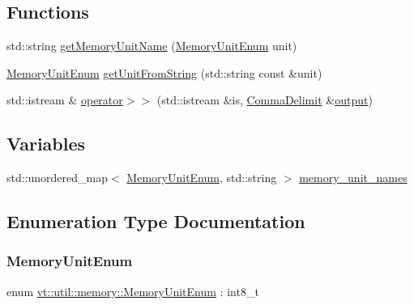 \subsection*{Functions}
\begin{DoxyCompactItemize}
\item 
std\+::string \hyperlink{namespacevt_1_1util_1_1memory_a6a1de4e8806e74e6e0ef92e4262b654b}{get\+Memory\+Unit\+Name} (\hyperlink{namespacevt_1_1util_1_1memory_a64df3d84293b34009f78e2a1db2f9bb6}{Memory\+Unit\+Enum} unit)
\item 
\hyperlink{namespacevt_1_1util_1_1memory_a64df3d84293b34009f78e2a1db2f9bb6}{Memory\+Unit\+Enum} \hyperlink{namespacevt_1_1util_1_1memory_aeceb7d7ac924dd3d88a58eab5ebf64f7}{get\+Unit\+From\+String} (std\+::string const \&unit)
\item 
std\+::istream \& \hyperlink{namespacevt_1_1util_1_1memory_afe1acbbca9aa1bd7310548cefd40045c}{operator$>$$>$} (std\+::istream \&is, \hyperlink{structvt_1_1util_1_1memory_1_1_comma_delimit}{Comma\+Delimit} \&\hyperlink{namespacevt_ad3ca3e8710dd3c8badff897f8de3c858}{output})
\end{DoxyCompactItemize}
\subsection*{Variables}
\begin{DoxyCompactItemize}
\item 
std\+::unordered\+\_\+map$<$ \hyperlink{namespacevt_1_1util_1_1memory_a64df3d84293b34009f78e2a1db2f9bb6}{Memory\+Unit\+Enum}, std\+::string $>$ \hyperlink{namespacevt_1_1util_1_1memory_aa772e07fd4860ed4086654c53eed51c2}{memory\+\_\+unit\+\_\+names}
\end{DoxyCompactItemize}


\subsection{Enumeration Type Documentation}
\mbox{\label{namespacevt_1_1util_1_1memory_a64df3d84293b34009f78e2a1db2f9bb6}} 
\subsubsection{\texorpdfstring{Memory\+Unit\+Enum}{MemoryUnitEnum}}
{\footnotesize\ttfamily enum \hyperlink{namespacevt_1_1util_1_1memory_a64df3d84293b34009f78e2a1db2f9bb6}{vt\+::util\+::memory\+::\+Memory\+Unit\+Enum} \+: int8\+\_\+t\hspace{0.3cm}{\ttfamily [strong]}}

